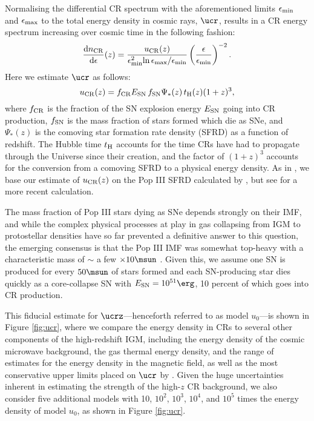 Normalising the differential CR spectrum with the aforementioned limits $\epsilon_{\rm min}$ and $\epsilon_{\rm max}$ to the total energy density in cosmic rays, $\ucr$, results in a CR energy spectrum increasing over cosmic time in the following fashion:
 \begin{equation}
 \frac{{\rm d}n_{\rm \small CR}}{{\rm d}\epsilon}(z) = \frac{u_{\rm \small CR}(z)}{\epsilon_{\rm min}^2{\rm ln}\,\epsilon_{\rm max}{\large /}\epsilon_{\rm min}}  \left( \frac{\epsilon}{\epsilon_{\rm min}} \right)^{-2}.
 \end{equation}
Here we estimate $\ucr$ as follows:
\begin{equation}
u_{\rm \small CR}(z) = f_{\rm \small CR} E_{\rm \small SN}\, f_{\rm \small SN} \Psi_{*}(z)\, t_{\rm \small H}(z) (1+z)^3,
\end{equation}
where $f_{\rm \small CR}$ is the fraction of the SN explosion energy $E_{\rm \small SN}$ going into CR production, $f_{\rm \small SN}$ is the mass fraction of stars formed which die as SNe, and $\Psi_{*}(z)$ is the comoving star formation rate density (SFRD) as a function of redshift.  The Hubble time $t_{\rm \small H}$ accounts for the time CRs have had to propagate through the Universe since their creation, and the factor of $(1+z)^3$ accounts for the conversion from a comoving SFRD to a physical energy density. As in \citet{Hummeletal2015}, we base our estimate of $u_{\rm \small CR}(z)$ on the Pop III SFRD calculated by \citet{GreifBromm2006}, but see \citet{Campisietal2011} for a more recent calculation. 

The mass fraction of Pop III stars dying as SNe depends strongly on their IMF, and while the complex physical processes at play in gas collapsing from IGM to protostellar densities have so far prevented a definitive answer to this question, the emerging consensus is that the Pop III IMF was somewhat top-heavy with a characteristic mass of $\sim$ a few $\times 10\msun$ \citep{Bromm2013}.  Given this, we assume one SN is produced for every $50\msun$ of stars formed and each SN-producing star dies quickly as a core-collapse SN with $E_{\rm \small SN} = 10^{51}\erg$, 10 percent of which goes into CR production.  

This fiducial estimate for $\ucrz$---henceforth referred to as model $u_0$---is shown in Figure \ref{fig:ucr}, where we compare the energy density in CRs to several other components of the high-redshift IGM, including the energy density of the cosmic microwave background, the gas thermal energy density, and the range of estimates for the energy density in the magnetic field, as well as the most conservative upper limits placed on $\ucr$ by \citet{RollindeVangioniOlive2006}. Given the huge uncertainties inherent in estimating the strength of the high-$z$ CR background, we also consider five additional models with 10, $10^2$, $10^3$, $10^4$, and $10^5$ times the energy density of model $u_0$, as shown in Figure \ref{fig:ucr}.
 